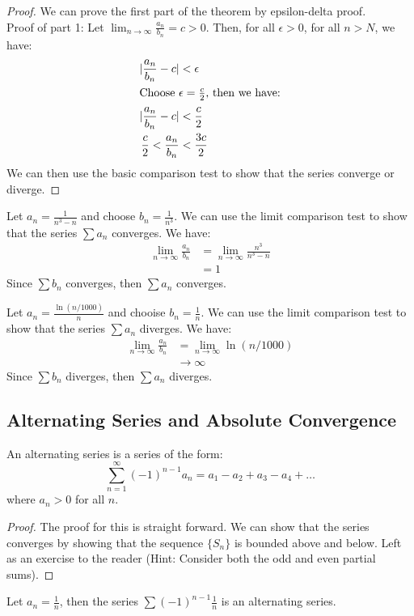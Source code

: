 \documentclass[11pt]{article}
\begin{document}
\begin{proof}
    We can prove the first part of the theorem by epsilon-delta proof. 
    \\
    Proof of part 1: Let $\lim_{n \to \infty} \frac{a_n}{b_n} = c > 0$. Then, for all $\epsilon > 0$, for all $n > N$, we have:
    \begin{align*}
        |\frac{a_n}{b_n} - c| &< \epsilon \\
        \intertext{Choose $\epsilon = \frac{c}{2}$, then we have:}
        |\frac{a_n}{b_n} - c| &< \frac{c}{2} \\
        \frac{c}{2} < \frac{a_n}{b_n} &< \frac{3c}{2} \\
    \end{align*}
    We can then use the basic comparison test to show that the series converge or diverge.
\end{proof}
\begin{example}
    Let $a_n = \frac{1}{n^3 - n}$ and choose $b_n = \frac{1}{n^3}$. We can use the limit comparison test to show that the series $\sum a_n$ converges. We have:
    \begin{align*}
        \lim_{n \to \infty} \frac{a_n}{b_n} &= \lim_{n \to \infty} \frac{n^3}{n^3 - n} \\
        &= 1
    \end{align*}
    Since $\sum b_n$ converges, then $\sum a_n$ converges.
\end{example}
\begin{example}
    Let $a_n = \frac{\ln(n/1000)}{n}$ and chooise $b_n = \frac{1}{n}$. We can use the limit comparison test to show that the series $\sum a_n$ diverges. We have:
    \begin{align*}
        \lim_{n \to \infty} \frac{a_n}{b_n} &= \lim_{n \to \infty} \ln(n/1000) \\
        &\to \infty
    \end{align*}
    Since $\sum b_n$ diverges, then $\sum a_n$ diverges.
\end{example}
\subsection{Alternating Series and Absolute Convergence}
\begin{definition}
    An alternating series is a series of the form:
    \begin{equation}
        \sum_{n=1}^{\infty} (-1)^{n-1} a_n = a_1 - a_2 + a_3 - a_4 + \ldots
    \end{equation}
    where $a_n > 0$ for all $n$.
\end{definition}
\begin{proof}
    The proof for this is straight forward. We can show that the series converges by showing that the sequence $\{S_n\}$ is bounded above and below. Left as an exercise to the reader (Hint: Consider both the odd and even partial sums).
\end{proof}
\begin{example}
    Let $a_n = \frac{1}{n}$, then the series $\sum (-1)^{n-1} \frac{1}{n}$ is an alternating series.
\end{example}
\end{document}
